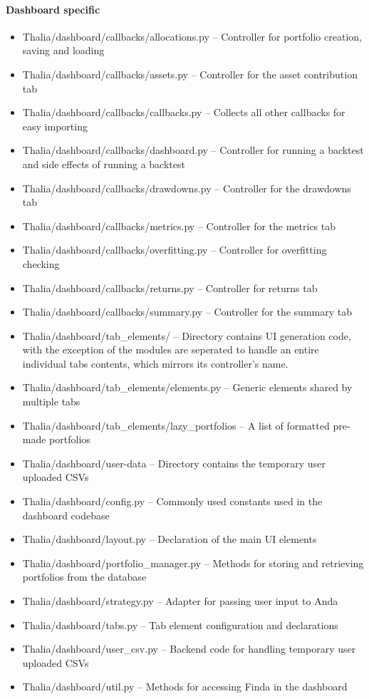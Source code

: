 \documentclass[main.tex]{subfiles}
\begin{document}
\paragraph{Dashboard specific}\label{dashboard-specific}

\begin{itemize}

\item
  Thalia/dashboard/callbacks/allocations.py -- Controller for portfolio
  creation, saving and loading
\item
  Thalia/dashboard/callbacks/assets.py -- Controller for the asset
  contribution tab
\item
  Thalia/dashboard/callbacks/callbacks.py -- Collects all other
  callbacks for easy importing
\item
  Thalia/dashboard/callbacks/dashboard.py -- Controller for running a
  backtest and side effects of running a backtest
\item
  Thalia/dashboard/callbacks/drawdowns.py -- Controller for the
  drawdowns tab
\item
  Thalia/dashboard/callbacks/metrics.py -- Controller for the metrics
  tab
\item
  Thalia/dashboard/callbacks/overfitting.py -- Controller for
  overfitting checking
\item
  Thalia/dashboard/callbacks/returns.py -- Controller for returns tab
\item
  Thalia/dashboard/callbacks/summary.py -- Controller for the summary
  tab
\item
  Thalia/dashboard/tab\_elements/ -- Directory contains UI generation
  code, with the exception of the modules are seperated to handle an
  entire individual tabs contents, which mirrors its controller's name.
\item
  Thalia/dashboard/tab\_elements/elements.py -- Generic elements shared
  by multiple tabs
\item
  Thalia/dashboard/tab\_elements/lazy\_portfolios -- A list of formatted
  pre-made portfolios
\item
  Thalia/dashboard/user-data -- Directory contains the temporary user
  uploaded CSVs
\item
  Thalia/dashboard/config.py -- Commonly used constants used in the
  dashboard codebase
\item
  Thalia/dashboard/layout.py -- Declaration of the main UI elements
\item
  Thalia/dashboard/portfolio\_manager.py -- Methods for storing and
  retrieving portfolios from the database
\item
  Thalia/dashboard/strategy.py -- Adapter for passing user input to Anda
\item
  Thalia/dashboard/tabs.py -- Tab element configuration and declarations
\item
  Thalia/dashboard/user\_csv.py -- Backend code for handling temporary
  user uploaded CSVs
\item
  Thalia/dashboard/util.py -- Methods for accessing Finda in the
  dashboard
\end{itemize}
\end{document}
